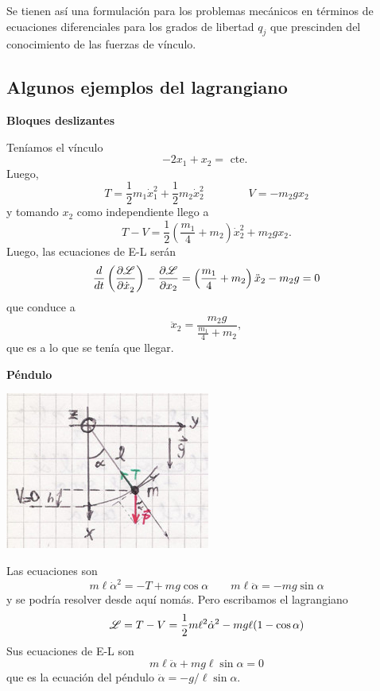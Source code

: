 \documentclass[10pt,oneside]{CBFT_book}
\begin{document}
Se tienen así una formulación para los problemas mecánicos en términos de ecuaciones diferenciales para los
grados de libertad $q_j$ que prescinden del conocimiento de las fuerzas de vínculo.

\subsection{Algunos ejemplos del lagrangiano}


\begin{ejemplo}{\bfseries Bloques deslizantes}

Teníamos el vínculo 
\[
	-2x_1 + x_2 = \text{ cte. }
\]
Luego,
\[
	T = \frac 1 2 m_1 \dot{x}_1^2 + \frac 1 2 m_2 \dot{x}_2^2 \qquad \qquad V = -m_2 g x_2
\]
y tomando $x_2$ como independiente llego a
\[
	T-V = \frac{1}{2}\left( \frac{m_1}{4} + m_2 \right) \dot{x}_2^2 + m_2gx_2.
\]
Luego, las ecuaciones de E-L serán
\[
	\frac{d^{\hspace{-0.05em}} {}}{d {t}^{\hspace{-0.05em}}}\left( \frac{\partial^{\hspace{-0.05em}} {\mathscr{L}}}{\partial {\dot{x}_2}^{\hspace{-0.05em}}} \right) - \frac{\partial^{\hspace{-0.05em}} {\mathscr{L}}}{\partial {x_2}^{\hspace{-0.05em}}} =
	\left( \frac{m_1}{4} + m_2 \right) \ddot{x}_2 - m_2 g = 0
\]
que conduce a 
\[
	\ddot{x}_2 = \frac{m_2 g}{\frac{m_1}{4} + m_2 },
\]
que es a lo que se tenía que llegar.
\end{ejemplo}

\begin{ejemplo}{\bfseries Péndulo}

\includegraphics[scale=0.35]{images/fig_mc_pendulo_lag.jpg}

Las ecuaciones son 
\[
	m\ell \dot{\alpha}^2 = - T + m g \cos \alpha \qquad 
	m\ell \ddot{\alpha} = - m g \sin \alpha
\]
y se podría resolver desde aquí nomás. Pero escribamos el lagrangiano
\[
	\mathscr{L} = T-V = \frac 1 2 m \ell^2 \dot{\alpha}^2 - mg\ell(1-\cos \alpha)
\]
Sus ecuaciones de E-L son
\[
	m \ell \ddot{\alpha} + mg\ell \sin \alpha = 0
\]
que es la ecuación del péndulo $\ddot{\alpha} = -g/\ell \sin \alpha$.

\end{ejemplo}
\end{document}
